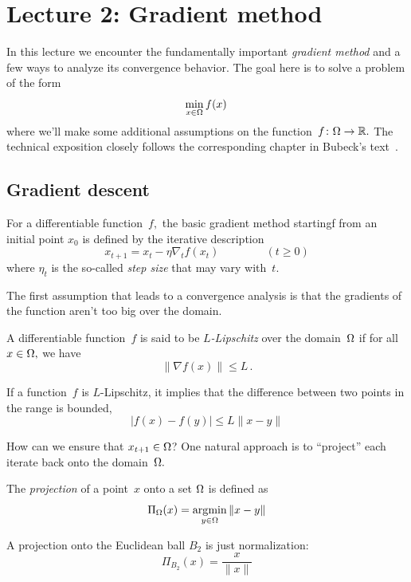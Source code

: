 \section{Lecture 2: Gradient method}

In this lecture we encounter the fundamentally important \emph{gradient method}
and a few ways to analyze its convergence behavior.
The goal here is to solve a problem of the form
\[
\min_{x\in\Omega} f(x)\,
\]
where we'll make some additional assumptions on the
function~$f\colon\Omega\to\mathbb{R}.$ The technical exposition closely follows the
corresponding chapter in Bubeck's text~\cite{Bubeck}.

\subsection{Gradient descent}

For a differentiable function~$f,$ the basic gradient method startingf from an
initial point $x_0$ is defined by the iterative description
\[
x_{t+1} = x_t - \eta \nabla_t f(x_t)\,\qquad\qquad(t\ge 0)
\]
where $\eta_t$ is the so-called \emph{step size} that may vary with~$t.$

The first assumption that leads to a convergence analysis is that the gradients
of the function aren't too big over the domain.

\begin{definition}[$L$-Lipschitz]
A differentiable function~$f$ is said to be \emph{$L$-Lipschitz} over the
domain~$\Omega$ if for all~$x\in\Omega,$ we have
\[
\|\nabla f(x)\| \leq L\,.
\]
\end{definition}

\begin{fact}
If a function~$f$ is $L$-Lipschitz, it implies that the difference between two points in the range is bounded,
\[
|f(x) - f(y)| \leq L \|x - y\|
\]
\end{fact}

How can we ensure that $x_{t+1}\in\Omega$?  One natural approach is to
``project'' each iterate back onto the domain~$\Omega.$

\begin{definition}[Projection]
The \emph{projection} of a point~$x$ onto a set $\Omega$ is defined as
\[
\Pi_{\Omega}(x) = \operatorname*{\arg\!\min}_{y\in\Omega} \|x-y\|
\]
\end{definition}

\begin{example}
A projection onto the Euclidean ball $B_2$ is just normalization:
\[
\Pi_{B_2}(x) = \dfrac{x}{\|x\|}
\]
\end{example}

